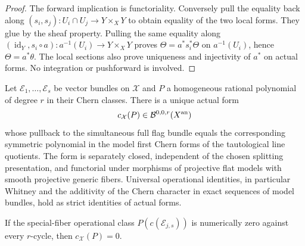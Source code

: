 \begin{proof}
The forward implication is functoriality.  Conversely pull the equality
back along $(s_i,s_j):U_i\cap U_j\to Y\times_XY$ to obtain equality
of the two local forms.  They glue by the sheaf property.  Pulling the
same equality along
$(\operatorname{id}_Y,s_i\circ a):a^{-1}(U_i)\to Y\times_XY$ proves
$\Theta=a^*s_i^*\Theta$ on $a^{-1}(U_i)$, hence $\Theta=a^*\theta$.
The local sections also prove uniqueness and injectivity of $a^*$ on
actual forms.  No integration or pushforward is involved.
\end{proof}

\begin{theorem}
\label{r10c:chern}
Let $\mathcal E_1,\ldots,\mathcal E_s$ be vector bundles on
$\mathcal X$ and $P$ a homogeneous rational polynomial of degree $r$
in their Chern classes.  There is a unique actual form
\[
              c_{\mathcal X}(P)\in\mathcal B^{0,0,r}(X^{\rm an})
\]
whose pullback to the simultaneous full flag bundle equals the
corresponding symmetric polynomial in the model first Chern forms of
the tautological line quotients.  The form is separately closed,
independent of the chosen splitting presentation, and functorial under
morphisms of projective flat models with smooth projective generic
fibers.  Universal operational identities, in particular Whitney and
the additivity of the Chern character in exact sequences of model
bundles, hold as strict identities of actual forms.

If the special-fiber operational class $P(c(\mathcal E_{j,s}))$ is
numerically zero against every $r$-cycle, then $c_{\mathcal X}(P)=0$.
\end{theorem}

